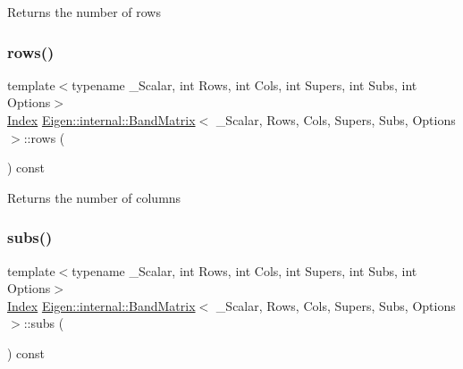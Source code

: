 \begin{DoxyReturn}{Returns}
the number of rows 
\end{DoxyReturn}
\mbox{\label{class_eigen_1_1internal_1_1_band_matrix_a40c7b51bc27f4e875c2f709c5a551090}} 
\subsubsection{\texorpdfstring{rows()}{rows()}}
{\footnotesize\ttfamily template$<$typename \+\_\+\+Scalar, int Rows, int Cols, int Supers, int Subs, int Options$>$ \\
\mbox{\hyperlink{struct_eigen_1_1_eigen_base_a554f30542cc2316add4b1ea0a492ff02}{Index}} \mbox{\hyperlink{class_eigen_1_1internal_1_1_band_matrix}{Eigen\+::internal\+::\+Band\+Matrix}}$<$ \+\_\+\+Scalar, Rows, Cols, Supers, Subs, Options $>$\+::rows (\begin{DoxyParamCaption}{ }\end{DoxyParamCaption}) const\hspace{0.3cm}{\ttfamily [inline]}}

\begin{DoxyReturn}{Returns}
the number of columns 
\end{DoxyReturn}
\mbox{\label{class_eigen_1_1internal_1_1_band_matrix_a8e685c7075a432979d72822db86e6d0e}} 
\subsubsection{\texorpdfstring{subs()}{subs()}}
{\footnotesize\ttfamily template$<$typename \+\_\+\+Scalar, int Rows, int Cols, int Supers, int Subs, int Options$>$ \\
\mbox{\hyperlink{struct_eigen_1_1_eigen_base_a554f30542cc2316add4b1ea0a492ff02}{Index}} \mbox{\hyperlink{class_eigen_1_1internal_1_1_band_matrix}{Eigen\+::internal\+::\+Band\+Matrix}}$<$ \+\_\+\+Scalar, Rows, Cols, Supers, Subs, Options $>$\+::subs (\begin{DoxyParamCaption}{ }\end{DoxyParamCaption}) const\hspace{0.3cm}{\ttfamily [inline]}}

